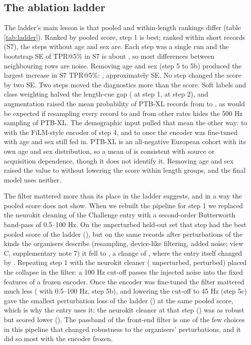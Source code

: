 \documentclass{iopjournal}
\makeatletter
\newcommand{\tpr}{TPR@5\%}
\makeatother
\begin{document}
\subsection{The ablation ladder}
\label{sec:res-ladder}
The ladder's main lesson is that pooled and within-length rankings differ (table \ref{tab:ladder}). Ranked by pooled score, step 1 is best; ranked within short records (S7), the steps without age and sex are. Each step was a single run and the bootstrap SE of \tpr{} in S7 is about \seSsevenTpr, so most differences between neighbouring rows are noise. Removing age and sex (step 5 to 5b) produced the largest increase in S7 \tpr: \demoDropDSseven, approximately \demoDropNse{} SE. No step changed the score by two SE. Two steps moved the diagnostics more than the score. Soft labels and class weighting halved the length-cue gap (\rowOneGap{} at step 1, \rowTwoGap{} at step 2), and augmentation raised the mean probability of PTB-XL records from \ptbRowTwo{} to \ptbRowThree, as would be expected if resampling every record to and from other rates hides the 500 Hz sampling of PTB-XL. The demographic input pulled that mean the other way: to \ptbRowFour{} with the FiLM-style encoder of step 4, and to \ptbRowFive{} once the encoder was fine-tuned with age and sex still fed in. PTB-XL is an all-negative European cohort with its own age and sex distribution, so a mean of \ptbRowFive{} is consistent with source or acquisition dependence, though it does not identify it. Removing age and sex raised the value to \ptbRowFiveB{} without lowering the score within length groups, and the final model uses neither.

The filter mattered more than its place in the ladder suggests, and in a way the pooled score does not show. When we rebuilt the pipeline for step 1 we replaced the neurokit cleaning of the Challenge entry with a second-order Butterworth band-pass of 0.5--100 Hz. On the unperturbed held-out set that step had the best pooled score of the ladder (\FiltRowOneA), but on the same records after perturbations of the kinds the organisers describe (resampling, device-like filtering, added noise; view C, supplementary note 7) it fell to \FiltRowOneC, a change of \FiltRowOneCminusA, where the entry itself changed by \FiltRowZeroCminusA. Repeating step 1 with the neurokit cleaner (\FiltRowOneBA{} unperturbed, \FiltRowOneBC{} perturbed) placed the collapse in the filter: a 100 Hz cut-off passes the injected noise into the fixed features of a frozen encoder. Once the encoder was fine-tuned the filter mattered much less (\FiltRowFiveBCminusA{} with 0.5--100 Hz, step 5b), and lowering the cut-off to 45 Hz (step 5c) gave the smallest perturbation loss of the ladder (\FiltRowFiveCCminusA) at the same pooled score, which is why the entry uses it; the neurokit cleaner at that step (\FiltRowFiveDCminusA) was as robust but scored lower (\FiltRowFiveDA). The passband of the front-end filter is one of the few choices in this pipeline that changed robustness to the organisers' perturbations, and it did so most with the encoder frozen.
\end{document}
